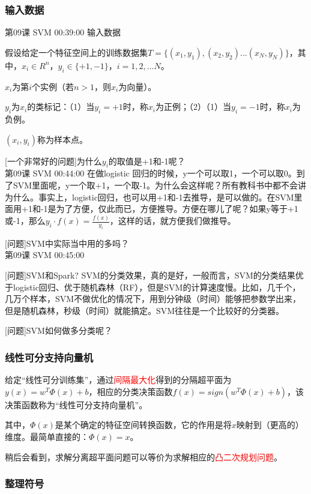 \documentclass[UTF8]{ctexart}
\begin{document}
\subsubsection{输入数据}

第09课 SVM 00:39:00 输入数据

假设给定一个特征空间上的训练数据集$T=\{(x_{1},y_{1}),(x_{2},y_{2})...(x_{N},y_{N})\}$，其中，$x_{i} \in R^{n}$，$y_{i} \in \{+1,-1\}$，$i=1,2,...N$。

$x_{i}$为第$i$个实例（若$n>1$，则$x_{i}$为向量）。

$y_{i}$为$x_{i}$的类标记：（1）当$y_{i}=+1$时，称$x_{i}$为正例；（2）（1）当$y_{i}=-1$时，称$x_{i}$为负例。

$(x_{i},y_{i})$称为样本点。

[一个非常好的问题]为什么$y_{i}$的取值是+1和-1呢？\\ 第09课 SVM 00:44:00
在做logistic 回归的时候，y一个可以取1，一个可以取0。到了SVM里面呢，y一个取+1，一个取-1。为什么会这样呢？所有教科书中都不会讲为什么。事实上，logistic回归，也可以用+1和-1去推导，是可以做的。在SVM里面用+1和-1是为了方便，仅此而已，方便推导。方便在哪儿了呢？如果y等于+1或-1，那么$y_{i} \cdot f(x) = \frac{f(x)}{y_{i}}$，这样的话，就方便我们做推导。

[问题]SVM中实际当中用的多吗？\\ 第09课 SVM 00:45:00

[问题]SVM和Spark? SVM的分类效果，真的是好，一般而言，SVM的分类结果优于logistic回归、优于随机森林（RF），但是SVM的计算速度慢。比如，几千个，几万个样本，SVM不做优化的情况下，用到分钟级（时间）能够把参数学出来，但是随机森林，秒级（时间）就能搞定。SVM往往是一个比较好的分类器。

[问题]SVM如何做多分类呢？

\subsubsection{线性可分支持向量机}

给定“线性可分训练集”，通过\textcolor{red}{间隔最大化}得到的分隔超平面为$y(x)=w^{T} \Phi (x) + b$，相应的分类决策函数$f(x)=sign(w^{T} \Phi (x) + b)$，该决策函数称为“线性可分支持向量机”。

其中，$\Phi (x)$是某个确定的特征空间转换函数，它的作用是将$x$映射到（更高的）维度。最简单直接的：$\Phi (x)=x$。

稍后会看到，求解分离超平面问题可以等价为求解相应的\textcolor{red}{凸二次规划问题}。

\subsubsection{整理符号}
\end{document}
